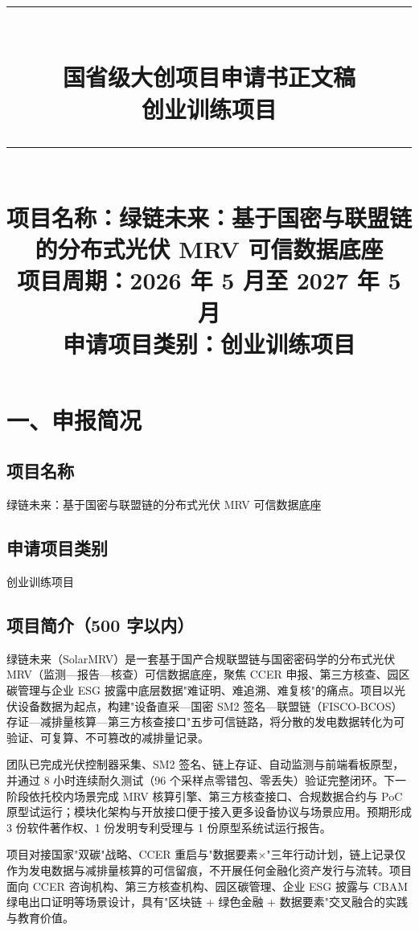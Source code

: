 \documentclass[12pt,a4paper]{article}
\title{
  \vspace{-1cm}
  {\color{titleblue}\rule{\textwidth}{2pt}}\\[0.6cm]
  {\LARGE\bfseries 国省级大创项目申请书正文稿}\\[0.3cm]
  {\large 创业训练项目}\\[0.3cm]
  {\color{titleblue}\rule{\textwidth}{2pt}}\\[0.8cm]
  {\large 项目名称：绿链未来：基于国密与联盟链的分布式光伏 MRV 可信数据底座}\\[0.3cm]
  {\normalsize 项目周期：2026 年 5 月至 2027 年 5 月}\\[0.3cm]
  {\normalsize 申请项目类别：创业训练项目}
}
\author{}
\date{}
\begin{document}
\maketitle
\thispagestyle{fancy}
\setcounter{page}{1}

\newpage
\section*{一、申报简况}

\subsection*{项目名称}

绿链未来：基于国密与联盟链的分布式光伏 MRV 可信数据底座

\subsection*{申请项目类别}

创业训练项目

\subsection*{项目简介（500 字以内）}

绿链未来（SolarMRV）是一套基于国产合规联盟链与国密密码学的分布式光伏 MRV（监测—报告—核查）可信数据底座，聚焦 CCER 申报、第三方核查、园区碳管理与企业 ESG 披露中底层数据"难证明、难追溯、难复核"的痛点。项目以光伏设备数据为起点，构建"设备直采—国密 SM2 签名—联盟链（FISCO-BCOS）存证—减排量核算—第三方核查接口"五步可信链路，将分散的发电数据转化为可验证、可复算、不可篡改的减排量记录。

团队已完成光伏控制器采集、SM2 签名、链上存证、自动监测与前端看板原型，并通过 8 小时连续耐久测试（96 个采样点零错包、零丢失）验证完整闭环。下一阶段依托校内场景完成 MRV 核算引擎、第三方核查接口、合规数据合约与 PoC 原型试运行；模块化架构与开放接口便于接入更多设备协议与场景应用。预期形成 3 份软件著作权、1 份发明专利受理与 1 份原型系统试运行报告。

项目对接国家"双碳"战略、CCER 重启与"数据要素×"三年行动计划，链上记录仅作为发电数据与减排量核算的可信留痕，不开展任何金融化资产发行与流转。项目面向 CCER 咨询机构、第三方核查机构、园区碳管理、企业 ESG 披露与 CBAM 绿电出口证明等场景设计，具有"区块链 + 绿色金融 + 数据要素"交叉融合的实践与教育价值。
\end{document}
